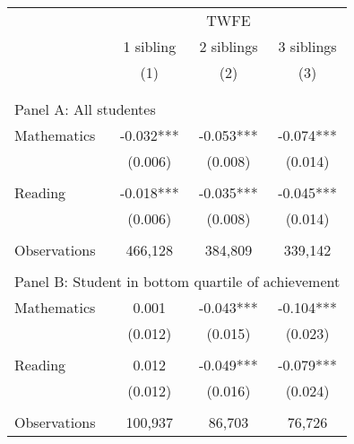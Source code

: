 \makeatletter
{}
{
\makeatother
\begin{tabular}{lccc}
\toprule
\cmidrule(lr){2-4}
& \multicolumn{3}{c}{TWFE} \\
\cmidrule(lr){2-4}
& 1 sibling & 2 siblings & 3 siblings  \\
\cmidrule(lr){2-2} \cmidrule(lr){3-3} \cmidrule(lr){4-4}
& (1) & (2) & (3)\\
\bottomrule
&  &  &  \\
&  &  &   \\
\multicolumn{4}{l}{Panel A: All studentes } \\
\hspace{3mm}Mathematics&      -0.032***&      -0.053***&      -0.074***\\
                    &     (0.006)   &     (0.008)   &     (0.014)   \\
 
&  &  &   \\
\hspace{3mm}Reading &      -0.018***&      -0.035***&      -0.045***\\
                    &     (0.006)   &     (0.008)   &     (0.014)   \\
                    &               &               &               \\
\hspace{3mm}Observations&     466,128   &     384,809   &     339,142   \\
 
&  &  &   \\
\multicolumn{4}{l}{Panel B: Student in bottom quartile of achievement} \\
\hspace{3mm}Mathematics&       0.001   &      -0.043***&      -0.104***\\
                    &     (0.012)   &     (0.015)   &     (0.023)   \\
 
&  &  &   \\
\hspace{3mm}Reading &       0.012   &      -0.049***&      -0.079***\\
                    &     (0.012)   &     (0.016)   &     (0.024)   \\
                    &               &               &               \\
\hspace{3mm}Observations&     100,937   &      86,703   &      76,726   \\
 

\end{tabular}}
